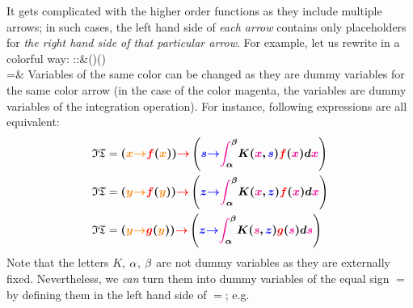 {It gets complicated with the higher order functions as they include multiple arrows; in such cases, the left hand side of \emph{each arrow} contains only placeholders for \emph{the right hand side of that particular arrow}. For example, let us rewrite  in a colorful way:
\bea
{}::{}&(\C\to\C)\to (\C\to\C)\\
={}&
\eea  
Variables of the same color can be changed as they are dummy variables for the same color arrow (in the case of the color magenta, the variables are dummy variables of the integration operation). For instance, following expressions are all equivalent:
\begin{equation*}
\begin{aligned}
\mathfrak{IT}={}&\bm{(\textcolor{orange}{x}\textcolor{orange}{\to} \textcolor{red}{f}(\textcolor{orange}{x}))\textcolor{red}{\to}\left(\textcolor{blue}{s}\textcolor{blue}{\to}\textcolor{magenta}{\int_{\textcolor{black}{\alpha}}^{\textcolor{black}{\beta}}} K(\textcolor{magenta}{x},\textcolor{blue}{s})\textcolor{red}{f}(\textcolor{magenta}{x})d\textcolor{magenta}{x}\right)}
\\
\mathfrak{IT}={}&\bm{(\textcolor{orange}{y}\textcolor{orange}{\to} \textcolor{red}{f}(\textcolor{orange}{y}))\textcolor{red}{\to}\left(\textcolor{blue}{z}\textcolor{blue}{\to}\textcolor{magenta}{\int_{\textcolor{black}{\alpha}}^{\textcolor{black}{\beta}}} K(\textcolor{magenta}{x},\textcolor{blue}{z})\textcolor{red}{f}(\textcolor{magenta}{x})d\textcolor{magenta}{x}\right)}
\\
\mathfrak{IT}={}&\bm{(\textcolor{orange}{y}\textcolor{orange}{\to} \textcolor{red}{g}(\textcolor{orange}{y}))\textcolor{red}{\to}\left(\textcolor{blue}{z}\textcolor{blue}{\to}\textcolor{magenta}{\int_{\textcolor{black}{\alpha}}^{\textcolor{black}{\beta}}} K(\textcolor{magenta}{s},\textcolor{blue}{z})\textcolor{red}{g}(\textcolor{magenta}{s})d\textcolor{magenta}{s}\right)}
\end{aligned}
\end{equation*}
Note that the letters $K$, $\alpha$, $\beta$ are not dummy variables as they are externally fixed. Nevertheless, we \emph{can} turn them into dummy variables of the equal sign $=$ by defining them in the left hand side of $=$; e.g.
}
